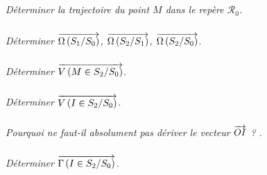 \documentclass[10pt,oneside]{article}
\begin{document}
\subparagraph{}
\textit{Déterminer la trajectoire du point $M$ dans le repère $\mathcal{R}_0$.}

\subparagraph{}
\textit{Déterminer $\overrightarrow{\Omega\left( {S_1}/{S_0}\right)}$, $\overrightarrow{\Omega\left( {S_2}/{S_1}\right)}$, $\overrightarrow{\Omega\left( {S_2}/{S_0}\right)}$.}

\subparagraph{}
\textit{Déterminer $\overrightarrow{V\left( {M} \in {S_2}/{S_0}\right)}$.}

\subparagraph{}
\textit{Déterminer $\overrightarrow{V\left( {I} \in {S_2}/{S_0}\right)}$.}


\subparagraph{}
\textit{Pourquoi ne faut-il absolument pas dériver le vecteur $\overrightarrow{OI}$ ? .}

\subparagraph{}
\textit{Déterminer $\overrightarrow{\Gamma \left( {I} \in {S_2}/{S_0}\right)}$.}
\end{document}
